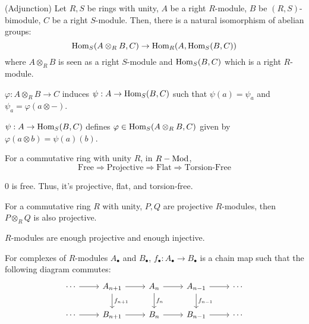 \documentclass{article}
\begin{document}
\begin{theorem}(Adjunction)
  Let \(R, S\) be rings with unity,
  \(A\) be a right \(R\)-module,
  \(B\) be \((R, S)\)-bimodule,
  \(C\) be a right \(S\)-module.
  Then, there is a natural isomorphism of abelian groups:
  \[\textnormal{Hom}_S(A \otimes_R B, C) \to \textnormal{Hom}_R(A, \textnormal{Hom}_S(B, C))\]
  where \(A \otimes_R B\) is seen as a right \(S\)-module and \(\textnormal{Hom}_S(B, C)\)
  which is a right \(R\)-module.
\end{theorem}
\begin{note}
  \(\varphi: A \otimes_R B \to C\) induces
  \(\psi: A \to \textnormal{Hom}_S(B, C)\) such that
  \(\psi(a) = \psi_a\)
  and
  \(\psi_a = \varphi(a \otimes -)\).
\end{note}
\begin{note}
  \(\psi: A \to \textnormal{Hom}_S(B, C)\) defines
  \(\varphi \in \textnormal{Hom}_S(A \otimes_R B, C)\)
  given by
  \(\varphi(a \otimes b) = \psi(a)(b)\).
\end{note}

\begin{theorem}
  For a commutative ring with unity \(R\), in \(R-\textnormal{Mod}\),
  \[\text{Free} \Rightarrow \text{Projective} \Rightarrow \text{Flat} \Rightarrow \text{Torsion-Free}\]
\end{theorem}
\begin{example}
  \(0\) is free. Thus, it's projective, flat, and torsion-free.
\end{example}

\begin{theorem}
  For a commutative ring \(R\) with unity,
  \(P, Q\) are projective \(R\)-modules,
  then \(P \otimes_R Q\) is also projective.
\end{theorem}

\begin{theorem}
  \(R\)-modules are enough projective and enough injective.
\end{theorem}

\begin{theorem}
  For complexes of \(R\)-modules \(A_\bullet\)  and \(B_\bullet\),
  \(f_\bullet: A_\bullet \to B_\bullet\) is a chain map
  such that the following diagram commutes:
  \[\begin{tikzcd}
  \cdots \ar{r} & A_{n + 1} \ar["f_{n+1}"]{d} \ar{r} & A_{n} \ar["f_{n}"]{d} \ar{r} & A_{n - 1} \ar["f_{n-1}"]{d} \ar{r} & \cdots \\
  \cdots \ar{r} & B_{n + 1} \ar{r} & B_{n} \ar{r} & B_{n - 1} \ar{r} & \cdots
  \end{tikzcd}\]
\end{theorem}
\end{document}
